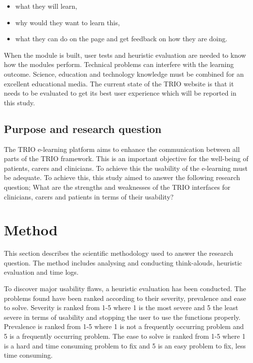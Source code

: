 \documentclass{sigchi}
\begin{document}
\begin{itemize}
    \item what they will learn, 
    \item why would they want to learn this, 
    \item what they can do on the page and get feedback on how they are doing. 
\end{itemize}

When the module is built, user tests and heuristic evaluation are needed to know how the modules perform. Technical problems can interfere with the learning outcome. Science, education and technology knowledge must be combined for an excellent educational media. The current state of the TRIO website is that it needs to be evaluated to get its best user experience which will be reported in this study. 

\subsection{Purpose and research question}
The TRIO e-learning platform aims to enhance the communication between all parts of the TRIO framework. This is an important objective for the well-being of patients, carers and clinicians. To achieve this the usability of the e-learning must be adequate. To achieve this, this study aimed to answer the following research question; What are the strengths and weaknesses of the TRIO interfaces for clinicians, carers and patients in terms of their usability?

\section{Method}
This section describes the scientific methodology used to answer the research question. The method includes analysing and conducting think-alouds, heuristic evaluation and time logs.

To discover major usability flaws, a heuristic evaluation has been conducted. The problems found have been ranked according to their severity, prevalence and ease to solve. Severity is ranked from 1-5 where 1 is the most severe and 5 the least severe in terms of usability and stopping the user to use the functions properly. Prevalence is ranked from 1-5 where 1 is not a frequently occurring problem and 5 is a frequently occurring problem. The ease to solve is ranked from 1-5 where 1 is a hard and time consuming problem to fix and 5 is an easy problem to fix, less time consuming. 
\end{document}
